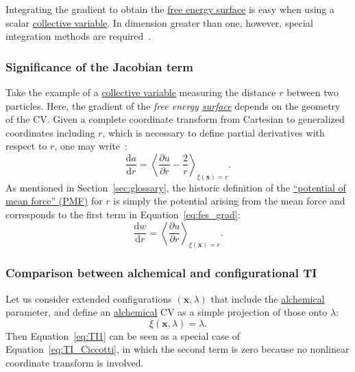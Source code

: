 \documentclass[9pt,review]{livecoms}
\newcommand{\vx}{\mathbf{x}}
\begin{document}
Integrating the gradient to obtain the \hyperlink{ref:FES} {free energy surface} is easy when using a scalar \hyperlink{ref:CV} {collective variable}. In dimension greater than one, however, special integration methods are required~\cite{Henin2021integration}.


\subsubsection{Significance of the Jacobian term}

Take the example of a \hyperlink{ref:CV} {collective variable} measuring the distance $r$ between two particles. Here, the gradient of the \textit{free energy \hyperlink{ref:FES} {surface}} depends on the geometry of the CV. Given a complete coordinate transform from Cartesian to generalized coordinates including $r$, which is necessary to define partial derivatives with respect to $r$, one may write~\cite{Henin2010a}:
\begin{equation}
    \frac{\mathrm{d}a}{\mathrm{d}r} = \left\langle \frac{\partial u}{\partial r}
    - \frac{2}{r} \right\rangle_{\xi(\vx) = r}.
    \label{eq:fes_grad}
\end{equation}
As mentioned in Section~\ref{sec:glossary}, the historic definition of the \hyperlink{ref:PMF} {``potential of mean force'' (PMF)} for $r$ is simply the potential arising from the mean force and corresponds to the first term in Equation~\ref{eq:fes_grad}:
\begin{equation}
    \frac{\mathrm{d} w}{\mathrm{d} r} = \left\langle \frac{\partial u}{\partial r} \right\rangle_{\xi(\vx) = r}.
    \label{eq:pmf_grad}
\end{equation}

\subsubsection{Comparison between alchemical and configurational TI}

Let us consider extended configurations $(\vx, \lambda)$ that include the \hyperlink{ref:Alchemical} {alchemical} parameter, and define an \hyperlink{ref:Alchemical} {alchemical} CV as a simple projection of those onto $\lambda$:
\begin{equation}
    \xi(\vx, \lambda) = \lambda .
\end{equation}
Then Equation~\ref{eq:TI1} can be seen as a special case of Equation~\ref{eq:TI_Ciccotti}, in which the second term is zero because no nonlinear coordinate transform is involved.
\end{document}
